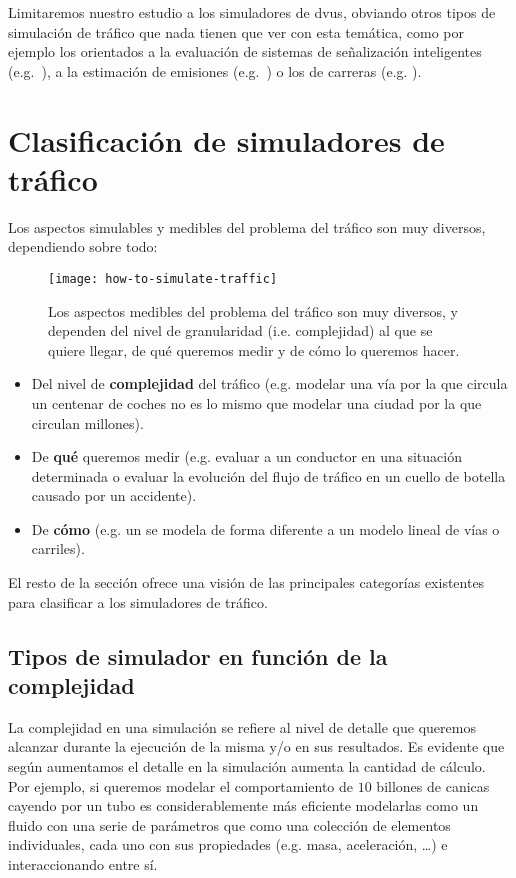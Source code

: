 Limitaremos nuestro estudio a los simuladores de \glspl{dvu}, obviando otros tipos de simulación de tráfico que nada tienen que ver con esta temática, como por ejemplo los orientados a la evaluación de sistemas de señalización inteligentes (e.g.~\cite{jin2016evaluation}), a la estimación de emisiones (e.g.~\cite{quaassdorff2016microscale}) o los de carreras (e.g. \cite{Wymann2013}).

\section{Clasificación de simuladores de tráfico}

Los aspectos simulables y medibles del problema del tráfico son muy diversos, dependiendo sobre todo:

\begin{figure}[t]
	\centering
	\texttt{[image: how-to-simulate-traffic]}
	\caption[Aspectos medibles del tráfico]{Los aspectos medibles del problema del tráfico son muy diversos, y dependen del nivel de granularidad (i.e. complejidad) al que se quiere llegar, de qué queremos medir y de cómo lo queremos hacer.}
	\label{fig:how-to-simulate-traffic}
\end{figure}

\begin{itemize}
	\item Del nivel de \textbf{complejidad} del tráfico (e.g. modelar una vía por la que circula un centenar de coches no es lo mismo que modelar una ciudad por la que circulan millones).
	\item De \textbf{qué} queremos medir (e.g. evaluar a un conductor en una situación determinada o evaluar la evolución del flujo de tráfico en un cuello de botella causado por un accidente).
	\item De \textbf{cómo} (e.g. un  se modela de forma diferente a un modelo lineal de vías o carriles).
\end{itemize}

El resto de la sección ofrece una visión de las principales categorías existentes para clasificar a los simuladores de tráfico.

\subsection{Tipos de simulador en función de la complejidad}

La complejidad en una simulación se refiere al nivel de detalle que queremos alcanzar durante la ejecución de la misma y/o en sus resultados. Es evidente que según aumentamos el detalle en la simulación aumenta la cantidad de cálculo. Por ejemplo, si queremos modelar el comportamiento de $10$ billones de canicas cayendo por un tubo es considerablemente más eficiente modelarlas como un fluido con una serie de parámetros que como una colección de elementos individuales, cada uno con sus propiedades (e.g. masa, aceleración, \ldots) e interaccionando entre sí.

